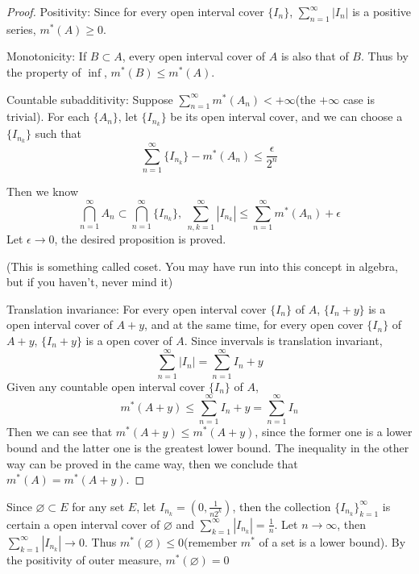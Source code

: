 \documentclass[lang=en, 12pt]{elegantbook}
\begin{document}
            \begin{proof}
                Positivity: Since for every open interval cover $\{I_n\}$, $\sum_{n=1}^{\infty}|I_n|$ is a positive series, $m^*(A) \geq 0$. \par    
                Monotonicity: If $B \subset A$, every open interval cover of $A$ is also that of $B$. Thus by the property of $\inf$,
                $m^*(B) \leq m^*(A)$. \par
                Countable subadditivity: Suppose $\sum_{n=1}^{\infty}m^*(A_n) < +\infty$(the $+\infty$ case is trivial). For each $\{A_n\}$,
            let $\{I_{n_k}\}$ be its open interval cover, and we can choose a $\{I_{n_k}\}$ such that 
                $$\sum_{n=1}^{\infty}\{I_{n_k}\} - m^*(A_n) \leq \frac{\epsilon}{2^n}$$ \par
                Then we know 
                $$\bigcap_{n=1}^{\infty}A_n \subset \bigcap_{n=1}^{\infty}\{I_{n_k}\},\ \sum_{n,k=1}^{\infty}|I_{n_k}| \leq \sum_{n=1}^{\infty}m^*(A_n) + \epsilon$$
                Let $\epsilon \to 0$, the desired proposition is proved.\par 
                (This is something called coset. You may have run into this concept in algebra, but if you haven't, never mind it)\par
                
                Translation invariance: For every open interval cover $\{I_n\}$ of $A$, $\{I_n+y\}$ is a open interval cover of $A+y$, and at the same time, 
                for every open cover $\{I_n\}$ of $A+y$, $\{I_n+y\}$ is a open cover of $A$. Since invervals is translation invariant,
                $$\sum_{n=1}^{\infty}|I_n| =\sum_{n=1}^{\infty}I_n+y$$ 
                Given any countable open interval cover $\{I_n\}$ of $A$,
                \begin{equation}
                    m^*(A+y) \leq \sum_{n=1}^{\infty}I_n+y = \sum_{n=1}^{\infty}I_n
                \end{equation}
                Then we can see that $m^*(A+y) \leq  m^*(A+y)$, since the former one is a lower bound and the latter one is the greatest lower bound.
                The inequality in the other way can be proved in the came way, then we conclude that $m^*(A)=m^*(A+y)$.  
            \end{proof}
            \begin{example}
                Since $\varnothing \subset E$ for any set $E$, let $I_{n_k} = (0,\frac{1}{n 2^k})$, then 
            the collection $\{I_{n_k}\}_{k=1}^{\infty}$ is certain a open interval cover of $\varnothing$ and 
            $\sum_{k=1}^{\infty}|I_{n_k}|= \frac{1}{n}$. Let $n\to \infty$, then $\sum_{k=1}^{\infty}|I_{n_k}| \to 0$. 
            Thus $m^*(\varnothing) \leq 0$(remember $m^*$ of a set is a lower bound). By the positivity of outer measure, $m^*(\varnothing) = 0$
            \end{example}
\end{document}
